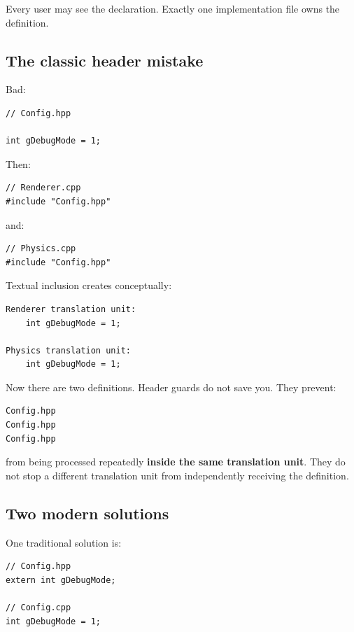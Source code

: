 Every user may see the declaration. Exactly one implementation file owns the definition.

\subsection{The classic header mistake}\label{01-foundations-i-ch002-the-classic-header-mistake}

Bad:

\begin{verbatim}
// Config.hpp

int gDebugMode = 1;
\end{verbatim}

Then:

\begin{verbatim}
// Renderer.cpp
#include "Config.hpp"
\end{verbatim}

and:

\begin{verbatim}
// Physics.cpp
#include "Config.hpp"
\end{verbatim}

Textual inclusion creates conceptually:

\begin{verbatim}
Renderer translation unit:
    int gDebugMode = 1;

Physics translation unit:
    int gDebugMode = 1;
\end{verbatim}

Now there are two definitions. Header guards do not save you. They prevent:

\begin{verbatim}
Config.hpp
Config.hpp
Config.hpp
\end{verbatim}

from being processed repeatedly \textbf{inside the same translation unit}. They do not stop a different translation unit from independently receiving the definition.

\subsection{Two modern solutions}\label{01-foundations-i-ch002-two-modern-solutions}

One traditional solution is:

\begin{verbatim}
// Config.hpp
extern int gDebugMode;

// Config.cpp
int gDebugMode = 1;
\end{verbatim}

